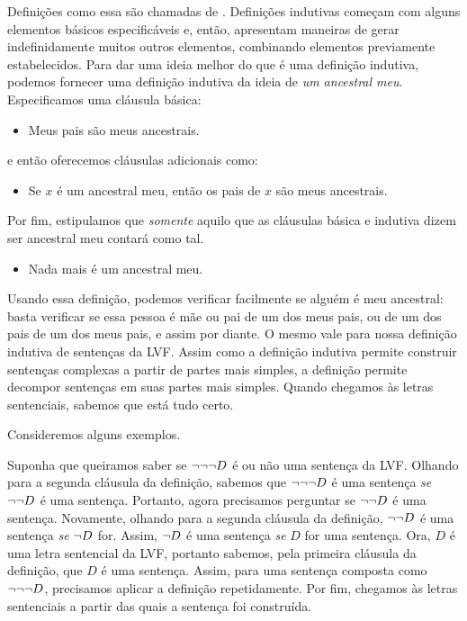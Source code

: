 Definições como essa são chamadas de . Definições
indutivas começam com alguns elementos básicos especificáveis e, então,
apresentam maneiras de gerar indefinidamente muitos outros elementos,
combinando elementos previamente estabelecidos. Para dar uma ideia
melhor do que é uma definição indutiva, podemos fornecer uma definição
indutiva da ideia de \emph{um ancestral meu}. Especificamos uma cláusula
básica:
	\begin{itemize}
		\item Meus pais são meus ancestrais.
	\end{itemize}
e então oferecemos cláusulas adicionais como:
	\begin{itemize}
		\item Se $x$ é um ancestral meu, então os pais de $x$ são meus ancestrais.
	\end{itemize}
Por fim, estipulamos que \emph{somente} aquilo que as cláusulas básica e
indutiva dizem ser ancestral meu contará como tal.
	\begin{itemize}
		\item Nada mais é um ancestral meu.
	\end{itemize}
Usando essa definição, podemos verificar facilmente se alguém é meu
ancestral: basta verificar se essa pessoa é mãe ou pai de um dos meus pais,
ou de um dos pais de um dos meus pais, e assim por diante. O mesmo vale para nossa
definição indutiva de sentenças da LVF. Assim como a definição indutiva
permite construir sentenças complexas a partir de partes mais simples, a
definição permite decompor sentenças em suas partes mais simples. Quando
chegamos às letras sentenciais, sabemos que está tudo certo.

Consideremos alguns exemplos.

Suponha que queiramos saber se $\neg \neg \neg D$ é ou não uma
sentença da LVF. Olhando para a segunda cláusula da definição, sabemos
que $\neg \neg \neg D$ é uma sentença \emph{se} $\neg \neg D$ é uma
sentença. Portanto, agora precisamos perguntar se $\neg \neg D$ é uma
sentença. Novamente, olhando para a segunda cláusula da definição,
$\neg \neg D$ é uma sentença \emph{se} $\neg D$ for. Assim,
$\neg D$ é uma sentença \emph{se} $D$ for uma sentença. Ora, $D$ é uma
letra sentencial da LVF, portanto sabemos, pela primeira cláusula da
definição, que $D$ é uma sentença. Assim, para uma sentença composta como
$\neg \neg \neg D$, precisamos aplicar a definição repetidamente.
Por fim, chegamos às letras sentenciais a partir das quais a sentença foi
construída.

